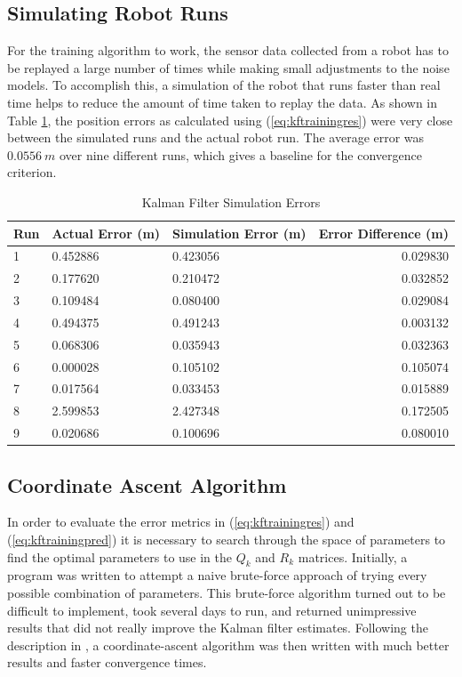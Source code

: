 \subsection{Simulating Robot Runs}
\label{sec:kfSimulation}
For the training algorithm to work, the sensor data collected from a robot has to be replayed a large number of times while making small adjustments to the noise models. To accomplish this, a simulation of the robot that runs faster than real time helps to reduce the amount of time taken to replay the data. As shown in Table \ref{tab:kfSimulationErrors}, the position errors as calculated using (\ref{eq:kftrainingres}) were very close between the simulated runs and the actual robot run. The average error was $0.0556~m$ over nine different runs, which gives a baseline for the convergence criterion.

\begin{table}[ht!]
\caption{Kalman Filter Simulation Errors}
\small
\centering
\begin{tabular}{@{}lllr@{}} \toprule
Run & Actual Error (m)  & Simulation Error (m) & Error Difference (m) \\ \midrule
1   & 0.452886          & 0.423056             & 0.029830             \\
2   & 0.177620          & 0.210472             & 0.032852             \\
3   & 0.109484          & 0.080400             & 0.029084             \\
4   & 0.494375          & 0.491243             & 0.003132             \\
5   & 0.068306          & 0.035943             & 0.032363             \\
6   & 0.000028          & 0.105102             & 0.105074             \\
7   & 0.017564          & 0.033453             & 0.015889             \\
8   & 2.599853          & 2.427348             & 0.172505             \\
9   & 0.020686          & 0.100696             & 0.080010             \\ \bottomrule
\end{tabular}
\label{tab:kfSimulationErrors}
\end{table}

\subsection{Coordinate Ascent Algorithm}
\label{sec:coordinateAscent}
In order to evaluate the error metrics in (\ref{eq:kftrainingres}) and (\ref{eq:kftrainingpred}) it is necessary to search through the space of parameters to find the optimal parameters to use in the $Q_k$ and $R_k$ matrices. Initially, a program was written to attempt a naive brute-force approach of trying every possible combination of parameters. This brute-force algorithm turned out to be difficult to implement, took several days to run, and returned unimpressive results that did not really improve the Kalman filter estimates. Following the description in \cite{Abbeel-RSS-05}, a coordinate-ascent algorithm was then written with much better results and faster convergence times.

